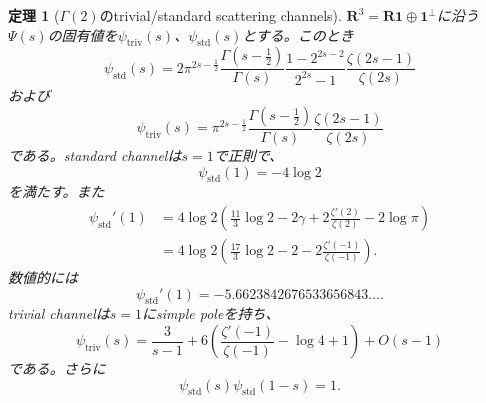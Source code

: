 \documentclass[11pt,a4paper]{ltjsarticle}
\newtheorem{theorem}{定理}[section]
\theoremstyle{definition}
\theoremstyle{remark}
\newcommand{\RR}{\mathbf R}
\newcommand{\one}{\mathbf 1}
\begin{document}
\begin{theorem}[$\Gamma(2)$のtrivial/standard scattering channels]
\label{thm:gamma2-scattering-channels}
$\RR^3=\RR\one\oplus\one^\perp$に沿う$\Psi(s)$の固有値を$\psi_{\mathrm{triv}}(s)$、$\psi_{\mathrm{std}}(s)$とする。このとき
\begin{equation}\label{eq:gamma2-std-scattering-function}
 \boxed{
 \psi_{\mathrm{std}}(s)
 =2\pi^{2s-\frac12}
  \frac{\Gamma(s-\frac12)}{\Gamma(s)}
  \frac{1-2^{2s-2}}{2^{2s}-1}
  \frac{\zeta(2s-1)}{\zeta(2s)}
 }
\end{equation}
および
\begin{equation}\label{eq:gamma2-triv-scattering-function}
 \boxed{
 \psi_{\mathrm{triv}}(s)
 =\pi^{2s-\frac12}
  \frac{\Gamma(s-\frac12)}{\Gamma(s)}
  \frac{\zeta(2s-1)}{\zeta(2s)}
 }
\end{equation}
である。standard channelは$s=1$で正則で、
\begin{equation}\label{eq:gamma2-std-value}
 \boxed{\psi_{\mathrm{std}}(1)=-4\log2}
\end{equation}
を満たす。また
\begin{align}
 \psi_{\mathrm{std}}'(1)
 &=4\log2\left(
   \frac{11}{3}\log2-2\gamma
   +2\frac{\zeta'(2)}{\zeta(2)}-2\log\pi
   \right)
 \label{eq:gamma2-std-derivative-a}\\
 &=4\log2\left(
   \frac{17}{3}\log2-2
   -2\frac{\zeta'(-1)}{\zeta(-1)}
   \right).
 \label{eq:gamma2-std-derivative-b}
\end{align}
数値的には
\[
 \psi_{\mathrm{std}}'(1)
 =-5.6623842676533656843\ldots.
\]
trivial channelは$s=1$にsimple poleを持ち、
\begin{equation}\label{eq:gamma2-triv-laurent}
 \boxed{
 \psi_{\mathrm{triv}}(s)
 =\frac{3}{s-1}
 +6\left(
   \frac{\zeta'(-1)}{\zeta(-1)}-\log4+1
   \right)
 +O(s-1)
 }
\end{equation}
である。さらに
\begin{equation}\label{eq:gamma2-std-functional-equation}
 \psi_{\mathrm{std}}(s)\psi_{\mathrm{std}}(1-s)=1.
\end{equation}
\end{theorem}
\end{document}
